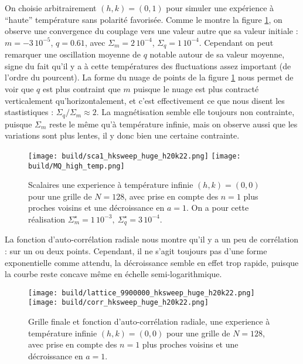\documentclass[a4paper, 11pt]{article}
\begin{document}
On choisie arbitrairement $(h, k) = (0, 1)$ pour simuler une expérience à ``haute'' température sans
polarité favorisée. Comme le montre la figure \ref{fig:high_en_sca}, on observe une convergence du
couplage vers une valeur autre que sa valeur initiale : $m = -3\,10^{-5}$, $q=0.61$, avec $\Sigma_m
= 2\,10^{-4}$, $\Sigma_q = 1\,10^{-4}$. Cependant on peut remarquer une oscillation moyenne de $q$
notable autour de sa valeur moyenne, signe du fait qu'il y a à cette températures des fluctuations
assez important (de l'ordre du pourcent). La forme du nuage de points de la figure
\ref{fig:high_en_sca} nous permet de voir que $q$ est plus contraint que $m$ puisque le nuage est
plus contracté verticalement qu'horizontalement, et c'est effectivement ce que nous disent les
stastistiques : $\Sigma_q/ \Sigma_m \approx 2$. La magnétisation semble elle toujours non
contrainte, puisque $\Sigma_m$ reste le même qu'à température infinie, mais on observe aussi que les
variations sont plus lentes, il y donc bien une certaine contrainte. 


\begin{figure}
    \centering
    \texttt{[image: build/sca1\_hksweep\_huge\_h20k22.png]}
    \texttt{[image: build/MQ\_high\_temp.png]}
    \caption{Scalaires une experience à température infinie $(h, k) = (0, 0)$ pour une grille de
    $N=128$, avec prise en compte des $n=1$ plus proches voisins et une décroissance en $a=1$. On a
    pour cette réalisation $\Sigma_m^\star = 1\,10^{-3},~ \Sigma_q^\star = 3\,10^{-4}$.}
    \label{fig:high_en_sca}
\end{figure}


La fonction d'auto-corrélation radiale nous montre qu'il y a un peu de corrélation : sur un ou deux
points. Cependant, il ne s'agit toujours pas d'une forme exponentielle comme attendu, la
décroissance semble en effet trop rapide, puisque la courbe reste concave même en échelle
semi-logarithmique. 

\begin{figure}
    \centering
    \texttt{[image: build/lattice\_9900000\_hksweep\_huge\_h20k22.png]}
    \texttt{[image: build/corr\_hksweep\_huge\_h20k22.png]}
    \caption{Grille finale et fonction d'auto-corrélation radiale, une experience à température
    infinie $(h, k) = (0, 0)$ pour une grille de $N=128$, avec prise en compte des $n=1$ plus
    proches voisins et une décroissance en $a=1$.} 
    \label{fig:high_en_corr}
\end{figure}
\end{document}
